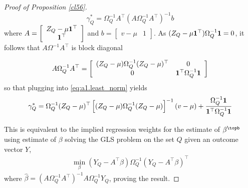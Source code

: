 \begin{proof}[Proof of Proposition \ref{cl56}]
\begin{equation}\label{eq:a1.least_norm}
 \gamma_Q^* = \Omega^{-1}_Q A^\top (A\Omega^{-1}_QA^\top)^{-1} b
\end{equation}
where $A = \left[ \begin{array}{cr} Z_Q - \mu {\bf 1}^\top\\ {\bf 1}^\top \end{array}\right]$ and $b = \left[\begin{array}{cr} v - \mu & 1 \end{array}\right]$. As $(Z_{Q} - \mu{\bf 1}^\top)\Omega_Q^{-1} {\bf 1} = 0$, it follows that $A\Omega^{-1}A^\top$ is block diagonal

\[ A\Omega_Q^{-1}A^\top = \left[\begin{array}{cc} (Z_Q - \mu)\Omega_Q^{-1} (Z_Q- \mu)^\top & 0  \\ 0 & {\bf 1}^\top \Omega^{-1}_Q{\bf 1}\end{array}\right] \]
so that plugging into \eqref{eq:a1.least_norm} yields
 \begin{equation*}
 \gamma^*_{Q} = \Omega_{Q}^{-1} (Z_{Q} - \mu)^\top\left[ (Z_Q - \mu) \Omega_{Q}^{-1} (Z_Q - \mu)\right]^{-1} (v - \mu) + \frac{\Omega^{-1}_Q {\bf 1} }{{\bf 1}^\top \Omega^{-1}_Q {\bf 1}}
 \end{equation*}

This is equivalent to the implied regression weights for the estimate of $\beta^\topb$ using estimate of $\beta$ solving the GLS problem on the set $Q$ given an outcome vector $Y$, 
\begin{align*}
    \min_{\beta} (Y_Q - A^\top \beta)\Omega_Q^{-1}(Y_Q - A^\top \beta)^\top
\end{align*}
%
where $\hat{\beta} = (A\Omega_Q^{-1}A^\top)^{-1}A\Omega_Q^{-1}Y_Q$, proving the result.

\end{proof}


